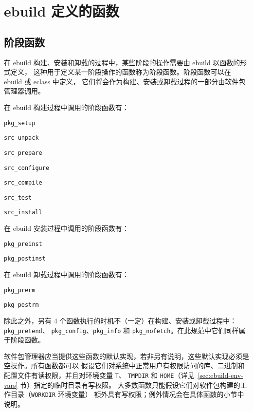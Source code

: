 \chapter{ebuild 定义的函数}
\label{ch:ebuild-functions}

\section{阶段函数}

在 ebuild 构建、安装和卸载的过程中，某些阶段的操作需要由 ebuild 以函数的形式定义，
这种用于定义某一阶段操作的函数称为阶段函数。阶段函数可以在 ebuild 或 eclass 中定义，
它们将会作为构建、安装或卸载过程的一部分由软件包管理器调用。

在 ebuild 构建过程中调用的阶段函数有：
\begin{compactitem}
\item \texttt{pkg_setup}
\item \texttt{src_unpack}
\item \texttt{src_prepare}
\item \texttt{src_configure}
\item \texttt{src_compile}
\item \texttt{src_test}
\item \texttt{src_install}
\end{compactitem}

在 ebuild 安装过程中调用的阶段函数有：
\begin{compactitem}
\item \texttt{pkg_preinst}
\item \texttt{pkg_postinst}
\end{compactitem}

在 ebuild 卸载过程中调用的阶段函数有：
\begin{compactitem}
\item \texttt{pkg_prerm}
\item \texttt{pkg_postrm}
\end{compactitem}

除此之外，另有 4 个函数执行的时机不（一定）在构建、安装或卸载过程中：\texttt{pkg_pretend}、
\texttt{pkg_config}、\texttt{pkg_info} 和 \texttt{pkg_nofetch}。在此规范中它们同样属于阶段函数。

软件包管理器应当提供这些函数的默认实现，若非另有说明，这些默认实现必须是空操作。所有函数都可以
假设它们对系统中正常用户有权限访问的库、二进制和配置文件有读权限，并且对环境变量 \texttt{T}、
\texttt{TMPDIR} 和 \texttt{HOME}（详见~\ref{sec:ebuild-env-vars} 节）指定的临时目录有写权限。
大多数函数只能假设它们对软件包构建的工作目录（\texttt{WORKDIR} 环境变量）
额外具有写权限；例外情况会在具体函数的小节中说明。

